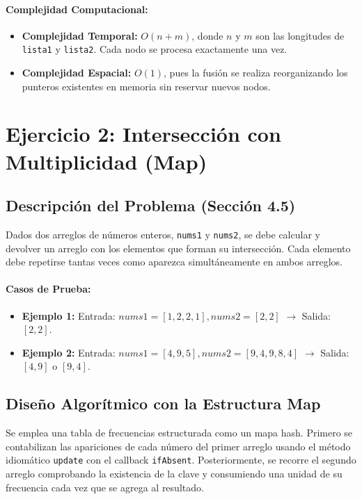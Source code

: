 \documentclass[12pt,a4paper]{article}
\begin{document}
\paragraph{Complejidad Computacional:}
\begin{itemize}
    \item \textbf{Complejidad Temporal:} $O(n + m)$, donde $n$ y $m$ son las longitudes de \texttt{lista1} y \texttt{lista2}. Cada nodo se procesa exactamente una vez.
    \item \textbf{Complejidad Espacial:} $O(1)$, pues la fusión se realiza reorganizando los punteros existentes en memoria sin reservar nuevos nodos.
\end{itemize}

\section{Ejercicio 2: Intersección con Multiplicidad (Map)}

\subsection{Descripción del Problema (Sección 4.5)}
Dados dos arreglos de números enteros, \texttt{nums1} y \texttt{nums2}, se debe calcular y devolver un arreglo con los elementos que forman su intersección. Cada elemento debe repetirse tantas veces como aparezca simultáneamente en ambos arreglos.

\paragraph{Casos de Prueba:}
\begin{itemize}
    \item \textbf{Ejemplo 1:} Entrada: $nums1 = [1,2,2,1], nums2 = [2,2]$ $\rightarrow$ Salida: $[2,2]$.
    \item \textbf{Ejemplo 2:} Entrada: $nums1 = [4,9,5], nums2 = [9,4,9,8,4]$ $\rightarrow$ Salida: $[4,9]$ o $[9,4]$.
\end{itemize}

\subsection{Diseño Algorítmico con la Estructura Map}
Se emplea una tabla de frecuencias estructurada como un mapa hash. Primero se contabilizan las apariciones de cada número del primer arreglo usando el método idiomático \texttt{update} con el callback \texttt{ifAbsent}. Posteriormente, se recorre el segundo arreglo comprobando la existencia de la clave y consumiendo una unidad de su frecuencia cada vez que se agrega al resultado.
\end{document}
